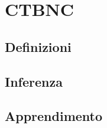 
\chapter{CTBNC}
\label{cap:ctbnc}

\lipsum[1]

\section{Definizioni}
\lipsum[2]

\section{Inferenza}
\lipsum[3]

\section{Apprendimento}
\lipsum[4-5]
